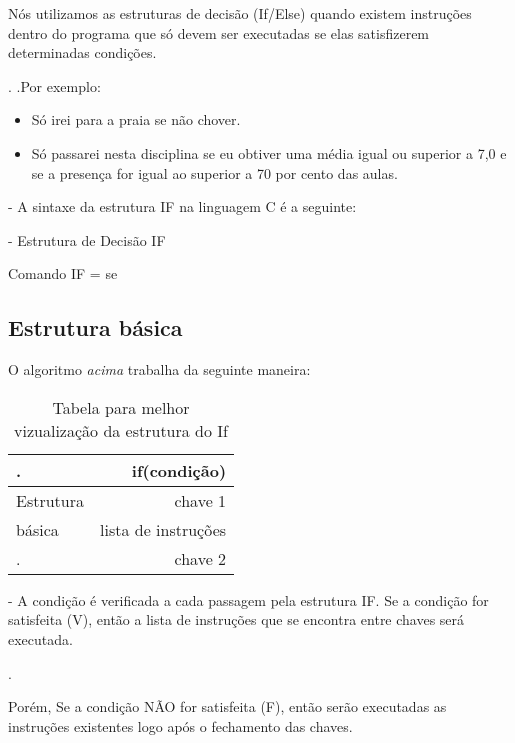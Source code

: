 \documentclass[a4paper,10pt]{article}  %
\begin{document}
  Nós utilizamos as estruturas de decisão (If/Else) quando existem instruções
dentro do programa que só devem ser executadas se elas satisfizerem  
determinadas condições.

 .
 .Por exemplo:
\begin{itemize}
               
       \item  Só irei para a praia se não chover. 
       \item  Só passarei nesta disciplina se eu obtiver uma média igual ou superior a 7,0 e se a presença for igual ao superior a 70 por cento das aulas.
             
\end{itemize}

  - A sintaxe da estrutura IF na linguagem C é a seguinte:
 
       - Estrutura de Decisão IF

Comando IF = se


\subsection{Estrutura básica}	       

O algoritmo \textit{acima} trabalha da seguinte maneira:

\begin{table}
\begin{center}
 \caption{Tabela para melhor vizualização da estrutura do If}
\begin{tabular}{|l|r|}
  \hline \hline
  
  .          & if(condição) \\ \hline
  Estrutura  & chave 1  \\ \hline
    básica   &   lista de instruções  \\ \hline
  .          & chave 2  \\ \hline
  
\end{tabular}
\label{tab:resultados}
\end{center}
\end{table}

 
  - A condição é verificada a cada passagem pela estrutura IF. Se a condição for satisfeita (V), então a lista de instruções que se encontra entre chaves será executada.

.

 Porém, Se a condição NÃO for satisfeita (F), então serão executadas as instruções existentes logo após o fechamento das chaves.
\end{document}
